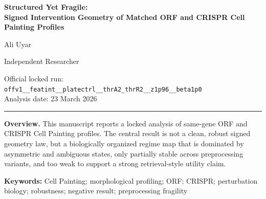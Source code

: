 \documentclass[11pt]{article}
\begin{document}
\begin{titlepage}
\color{ink}
\vspace*{1.5cm}

{\Large\bfseries Structured Yet Fragile:\\[0.25em]
Signed Intervention Geometry of Matched ORF and CRISPR Cell Painting Profiles\par}

\vspace{1.0cm}

{\large Ali Uyar\par}
{\normalsize Independent Researcher\par}

\vspace{0.8cm}

{\small
Official locked run: \texttt{offv1\_\_featint\_\_platectrl\_\_thrA2\_thrR2\_\_z1p96\_\_beta1p0}\\
Analysis date: 23 March 2026
\par}

\vspace{1.0cm}
\hrule
\vspace{0.6cm}

\textbf{Overview.}
This manuscript reports a locked analysis of same-gene ORF and CRISPR Cell Painting profiles. The central result is not a clean, robust signed geometry law, but a biologically organized regime map that is dominated by asymmetric and ambiguous states, only partially stable across preprocessing variants, and too weak to support a strong retrieval-style utility claim.

\vfill

\textbf{Keywords:} Cell Painting; morphological profiling; ORF; CRISPR; perturbation biology; robustness; negative result; preprocessing fragility
\end{titlepage}

\color{ink}
\clearpage
{}
\end{document}
